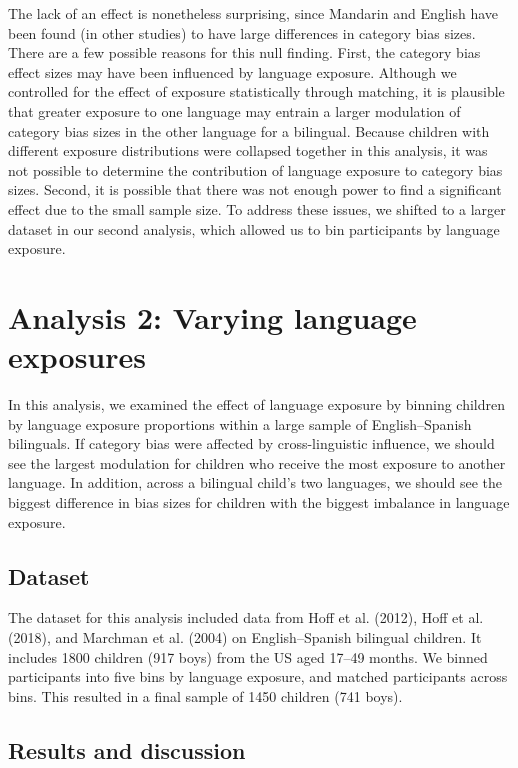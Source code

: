 \documentclass[10pt, letterpaper]{article}
\begin{document}
The lack of an effect is nonetheless surprising, since Mandarin and
English have been found (in other studies) to have large differences in
category bias sizes. There are a few possible reasons for this null
finding. First, the category bias effect sizes may have been influenced
by language exposure. Although we controlled for the effect of exposure
statistically through matching, it is plausible that greater exposure to
one language may entrain a larger modulation of category bias sizes in
the other language for a bilingual. Because children with different
exposure distributions were collapsed together in this analysis, it was
not possible to determine the contribution of language exposure to
category bias sizes. Second, it is possible that there was not enough
power to find a significant effect due to the small sample size. To
address these issues, we shifted to a larger dataset in our second
analysis, which allowed us to bin participants by language exposure.

\section{Analysis 2: Varying language
exposures}\label{analysis-2-varying-language-exposures}

In this analysis, we examined the effect of language exposure by binning
children by language exposure proportions within a large sample of
English--Spanish bilinguals. If category bias were affected by
cross-linguistic influence, we should see the largest modulation for
children who receive the most exposure to another language. In addition,
across a bilingual child's two languages, we should see the biggest
difference in bias sizes for children with the biggest imbalance in
language exposure.

\subsection{Dataset}\label{dataset-1}

The dataset for this analysis included data from Hoff et al. (2012),
Hoff et al. (2018), and Marchman et al. (2004) on English--Spanish
bilingual children. It includes 1800 children (917 boys) from the US
aged 17--49 months. We binned participants into five bins by language
exposure, and matched participants across bins. This resulted in a final
sample of 1450 children (741 boys).

\subsection{Results and discussion}\label{results-and-discussion-1}
\end{document}
